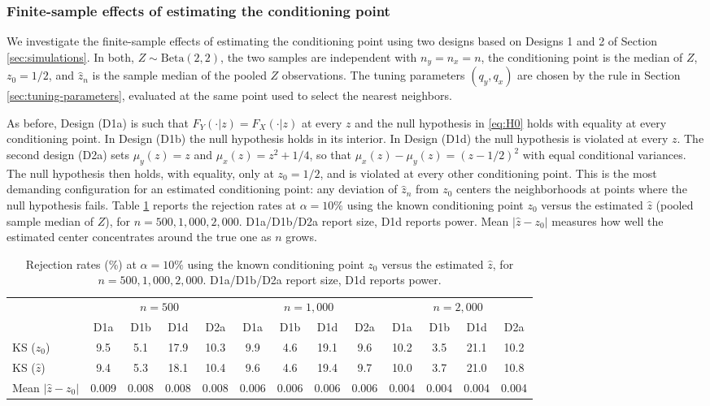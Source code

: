 \documentclass[11pt]{article}
\numberwithin{equation}{section}
\begin{document}
\subsubsection{Finite-sample effects of estimating the conditioning point}
We investigate the finite-sample effects of estimating the conditioning point using two designs based on Designs 1 and 2 of Section \ref{sec:simulations}. In both, $Z \sim \mathrm{Beta}(2,2)$, the two samples are independent with $n_y = n_x = n$, the conditioning point is the median of $Z$, $z_0 = 1/2$, and $\hat z_n$ is the sample median of the pooled $Z$ observations. The tuning parameters $(q_y, q_x)$ are chosen by the rule in Section \ref{sec:tuning-parameters}, evaluated at the same point used to select the nearest neighbors.

As before, Design (D1a) is such that $F_Y(\cdot|z) = F_X(\cdot|z)$ at every $z$ and the null hypothesis in \eqref{eq:H0} holds with equality at every conditioning point. In Design (D1b) the null hypothesis holds in its interior. In Design (D1d) the null hypothesis is violated at every $z$. The second design (D2a) sets $\mu_y(z) = z$ and $\mu_x(z) = z^2 + 1/4$, so that $\mu_x(z) - \mu_y(z) = (z - 1/2)^2$ with equal conditional variances. The null hypothesis then holds, with equality, only at $z_0 = 1/2$, and is violated at every other conditioning point. This is the most demanding configuration for an estimated conditioning point: any deviation of $\hat z_n$ from $z_0$ centers the neighborhoods at points where the null hypothesis fails. Table \ref{tab:est-z0} reports the rejection rates at $\alpha = 10\%$ using the known conditioning point $z_0$ versus the estimated $\hat{z}$ (pooled sample median of $Z$), for $n = 500, 1{,}000, 2{,}000$. D1a/D1b/D2a report size, D1d reports power. Mean $|\hat{z} - z_0|$ measures how well the estimated center concentrates around the true one as $n$ grows.

\begin{table}[h!]\footnotesize
  \begin{center}
  \begin{tabular}{lcccccccccccc}
  \hline
   & \multicolumn{4}{c}{$n = 500$} & \multicolumn{4}{c}{$n = 1{,}000$} & \multicolumn{4}{c}{$n = 2{,}000$} \\
  \cline{2-13}
   & D1a & D1b & D1d & D2a & D1a & D1b & D1d & D2a & D1a & D1b & D1d & D2a \\
  \hline
  KS ($z_0$)      & 9.5 & 5.1 & 17.9 & 10.3 & 9.9 & 4.6 & 19.1 & 9.6 & 10.2 & 3.5 & 21.1 & 10.2 \\
  KS ($\hat{z}$)       & 9.4 & 5.3 & 18.1 & 10.4 & 9.6 & 4.6 & 19.4 & 9.7 & 10.0 & 3.7 & 21.0 & 10.8 \\
  Mean $|\hat{z} - z_0|$ & 0.009 & 0.008 & 0.008 & 0.008 & 0.006 & 0.006 & 0.006 & 0.006 & 0.004 & 0.004 & 0.004 & 0.004 \\
  \hline
  \end{tabular}
  \caption{\footnotesize Rejection rates (\%) at $\alpha = 10\%$ using the known conditioning point $z_0$ versus the estimated $\hat{z}$, for $n = 500, 1{,}000, 2{,}000$. D1a/D1b/D2a report size, D1d reports power.}
  \label{tab:est-z0}
  \end{center}
  \end{table}

\normalsize

\end{document}
